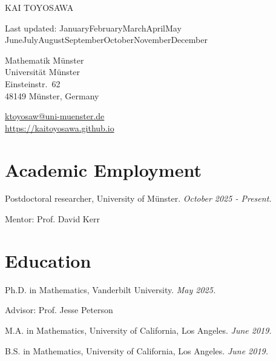 \documentclass[10pt,a4paper]{article}
\def\name{Kai Toyosawa}
\newcommand{\titlefont}[1]{{\large\MakeUppercase{#1}}}
\renewenvironment{itemize}{
  \begin{list}{}{
      \setlength{\leftmargin}{1.5em}
      \setlength{\itemsep}{0.25em}
      \setlength{\parskip}{0pt}
      \setlength{\parsep}{0.25em}
    }
}{
  \end{list}
}
\renewcommand{\today}{\ifcase \month \or January\or February\or March\or April\or May%
\or June\or July\or August\or September\or October\or November\or December\fi%
\space \number \year}
\begin{document}
\titlefont{\name}


\bigskip
Last updated: \today

\bigskip
\begin{minipage}[t]{0.495\textwidth}
  Mathematik M\"unster\\
  Universit\"at M\"unster\\
  Einsteinstr.\ 62\\
  48149 M\"unster, Germany
\end{minipage}
\begin{minipage}[t]{0.495\textwidth}
  \href{mailto:ktoyosaw@uni-muenster.de}{ktoyosaw@uni-muenster.de} \\
  \href{https://kaitoyosawa.github.io}{https://kaitoyosawa.github.io}
\end{minipage}


\section*{Academic Employment}

\begin{itemize}
  \item Postdoctoral researcher, University of M\"unster. \hfill \textit{October 2025 - Present.}
\begin{itemize}
    \item Mentor: Prof. David Kerr
    \end{itemize}
\end{itemize}


\section*{Education}

\begin{itemize}
  \item Ph.D. in Mathematics, Vanderbilt University. \hfill \textit{May 2025.}

    \begin{itemize}
    \item Advisor: Prof. Jesse Peterson
    \end{itemize}
  \item M.A. in Mathematics, University of California, Los Angeles. \hfill \textit{June 2019.}
  \item B.S. in Mathematics, %
    University of California, Los Angeles. \hfill \textit{June 2019.}
\end{itemize}
\end{document}
